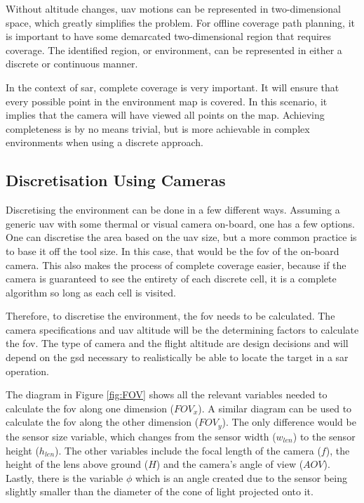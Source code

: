 Without altitude changes, \ac{uav} motions can be represented in two-dimensional space, which greatly simplifies the problem. For offline coverage path planning, it is important to have some demarcated two-dimensional region that requires coverage. The identified region, or environment, can be represented in either a discrete or continuous manner. 

In the context of \ac{sar}, complete coverage is very important. It will ensure that every possible point in the environment map is covered. In this scenario, it implies that the camera will have viewed all points on the map. Achieving completeness is by no means trivial, but is more achievable in complex environments when using a discrete approach.

\subsection{Discretisation Using Cameras}
Discretising the environment can be done in a few different ways. Assuming a generic \ac{uav} with some thermal or visual camera on-board, one has a few options. One can discretise the area based on the \ac{uav} size, but a more common practice is to base it off the tool size. In this case, that would be the \ac{fov} of the on-board camera. This also makes the process of complete coverage easier, because if the camera is guaranteed to see the entirety of each discrete cell, it is a complete algorithm so long as each cell is visited.

Therefore, to discretise the environment, the \ac{fov} needs to be calculated. The camera specifications and \ac{uav} altitude will be the determining factors to calculate the \ac{fov}. The type of camera and the flight altitude are design decisions and will depend on the \ac{gsd} necessary to realistically be able to locate the target in a \ac{sar} operation.

The diagram in Figure \ref{fig:FOV} shows all the relevant variables needed to calculate the \acl{fov} along one dimension ($FOV_x$). A similar diagram can be used to calculate the \acl{fov} along the other dimension ($FOV_y$). The only difference would be the sensor size variable, which changes from the sensor width ($w_{len}$) to the sensor height ($h_{len}$). The other variables include the focal length of the camera ($f$), the height of the lens above ground ($H$) and the camera's angle of view ($AOV$). Lastly, there is the variable $\phi$ which is an angle created due to the sensor being slightly smaller than the diameter of the cone of light projected onto it.

